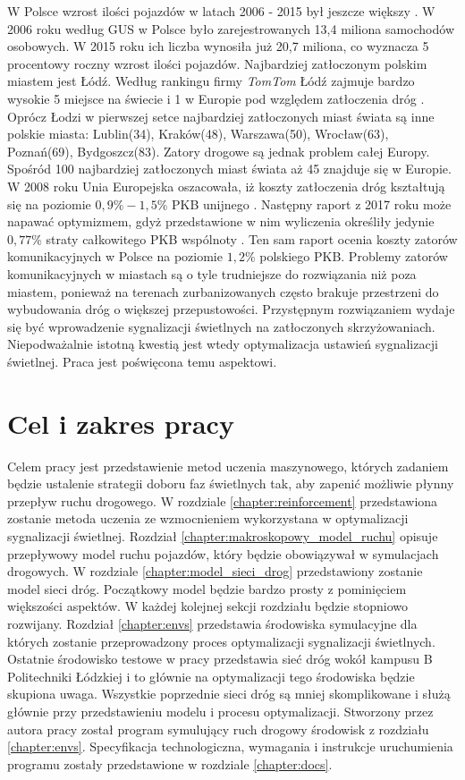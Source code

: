 \documentclass[12pt]{book}
\theoremstyle{plain}
\begin{document}
W Polsce wzrost ilości pojazdów w latach 2006 - 2015 był jeszcze większy \cite{liczbaPojazdowPolska}. W 2006 roku według GUS w Polsce było zarejestrowanych 13,4 miliona samochodów osobowych. W 2015 roku ich liczba wynosiła już 20,7 miliona, co wyznacza 5 procentowy roczny wzrost ilości pojazdów.
Najbardziej zatłoczonym polskim miastem jest Łódź. Według rankingu firmy \textit{TomTom } Łódź zajmuje bardzo wysokie 5 miejsce na świecie i 1 w Europie pod względem zatłoczenia dróg \cite{rankingTomTom}. Oprócz Łodzi w pierwszej setce najbardziej zatłoczonych miast świata są inne polskie miasta: Lublin(34), Kraków(48), Warszawa(50), Wrocław(63), Poznań(69), Bydgoszcz(83). Zatory drogowe są jednak problem całej Europy. Spośród 100 najbardziej zatłoczonych miast świata aż 45 znajduje się w Europie. W 2008 roku Unia Europejska oszacowała, iż koszty zatłoczenia dróg kształtują się na poziomie $0,9\%-1,5\%$ PKB unijnego \cite{ue2008}. Następny raport z 2017 roku może napawać optymizmem, gdyż przedstawione w nim wyliczenia określiły jedynie $0,77\%$ straty całkowitego PKB wspólnoty \cite{ue2017}. Ten sam raport ocenia koszty zatorów komunikacyjnych w Polsce na poziomie $1,2\%$ polskiego PKB.
Problemy zatorów komunikacyjnych w miastach są o tyle trudniejsze do rozwiązania niż poza miastem, ponieważ na terenach zurbanizowanych często brakuje przestrzeni do wybudowania dróg o większej przepustowości. Przystępnym rozwiązaniem wydaje się być wprowadzenie sygnalizacji świetlnych na zatłoczonych skrzyżowaniach. Niepodważalnie istotną kwestią jest wtedy optymalizacja ustawień sygnalizacji świetlnej. Praca jest poświęcona temu aspektowi.

\chapter{Cel i zakres pracy} \label{sec:cel_zakres_pracy}
Celem pracy jest przedstawienie metod uczenia maszynowego, których zadaniem będzie ustalenie strategii doboru faz świetlnych tak, aby zapenić możliwie płynny przepływ ruchu drogowego. W rozdziale \ref{chapter:reinforcement} przedstawiona zostanie metoda uczenia ze wzmocnieniem wykorzystana w optymalizacji sygnalizacji świetlnej. Rozdział \ref{chapter:makroskopowy_model_ruchu} opisuje przepływowy model ruchu pojazdów, który będzie obowiązywał w symulacjach drogowych. W rozdziale \ref{chapter:model_sieci_drog} przedstawiony zostanie model sieci dróg. Początkowy model będzie bardzo prosty z pominięciem większości aspektów. W każdej kolejnej sekcji rozdziału będzie stopniowo rozwijany. Rozdział \ref{chapter:envs} przedstawia środowiska symulacyjne dla których zostanie przeprowadzony proces optymalizacji sygnalizacji świetlnych. Ostatnie środowisko testowe w pracy przedstawia sieć dróg wokół kampusu B Politechniki Łódzkiej i to głównie na optymalizacji tego środowiska będzie skupiona uwaga. Wszystkie poprzednie sieci dróg są mniej skomplikowane i służą głównie przy przedstawieniu modelu i procesu optymalizacji. Stworzony przez autora pracy został program symulujący ruch drogowy środowisk z rozdziału \ref{chapter:envs}. Specyfikacja technologiczna, wymagania i instrukcje uruchumienia programu zostały przedstawione w rozdziale \ref{chapter:docs}.
\end{document}
